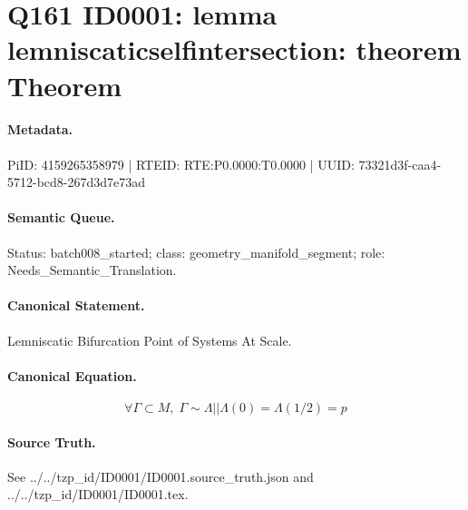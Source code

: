 \section*{Q161 ID0001: lemma lemniscaticselfintersection: theorem Theorem}
\paragraph{Metadata.}
PiID: 4159265358979 | RTEID: RTE:P0.0000:T0.0000 | UUID: 73321d3f-caa4-5712-bcd8-267d3d7e73ad

\paragraph{Semantic Queue.}
Status: batch008\_started; class: geometry\_manifold\_segment; role: Needs\_Semantic\_Translation.

\paragraph{Canonical Statement.}
Lemniscatic Bifurcation Point of Systems At Scale.

\paragraph{Canonical Equation.}
\[
\forall \Gamma \subset M,\; \Gamma \sim \Lambda || \Lambda(0)=\Lambda(1/2)=p
\]

\paragraph{Source Truth.}
See ../../tzp\_id/ID0001/ID0001.source\_truth.json and ../../tzp\_id/ID0001/ID0001.tex.
